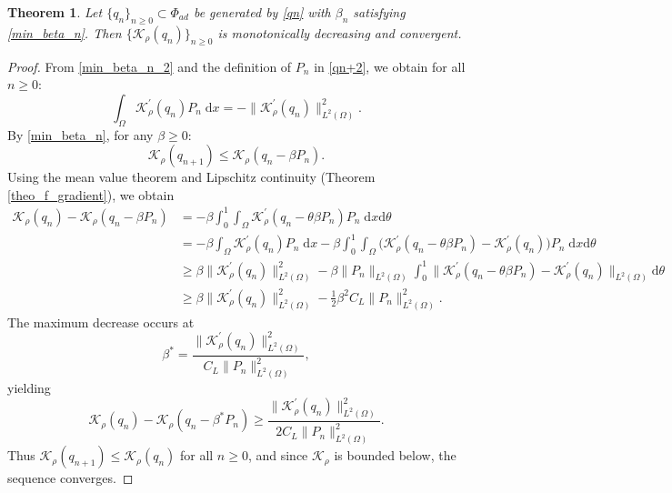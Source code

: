 \documentclass[a4paper,12pt,reqno,natbib]{amsart}
\newtheorem{theorem}{Theorem}
\newcommand{\dx} {\displaystyle\mathrm{d}x}
\begin{document}
{\begin{theorem} \label{theo_f_gradient_2}
    Let $\{q_n\}_{n\geq 0} \subset \Phi_{ad}$ be generated by \eqref{qn} with $\beta_n$ satisfying \eqref{min_beta_n}. Then $\{\mathcal{K}_\rho(q_n)\}_{n\geq 0}$ is monotonically decreasing and convergent.
\end{theorem}
\begin{proof}
From \eqref{min_beta_n_2} and the definition of $P_n$ in \eqref{qn+2}, we obtain for all $n \geq 0$:
\begin{equation*}
    \int_\Omega\mathcal{K}^\prime_\rho(q_n)P_n\;\dx=-\|\mathcal{K}^\prime_\rho(q_n) \|^2_{L^2(\Omega)}.
\end{equation*}
By \eqref{min_beta_n}, for any $\beta \geq 0$:
\begin{equation*}
    \mathcal{K}_\rho(q_{n+1}) \leq \mathcal{K}_\rho(q_n - \beta P_n).
\end{equation*}
Using the mean value theorem and Lipschitz continuity (Theorem \ref{theo_f_gradient}), we obtain
\begin{align*}
    \mathcal{K}_\rho(q_{n}) - \mathcal{K}_\rho(q_n - \beta P_n) &= -\beta \int_0^1\int_\Omega \mathcal{K}_\rho^\prime (q_n - \theta\beta P_n)P_n\;\dx\mathrm{d}\theta\\
    &= -\beta \int_\Omega \mathcal{K}_\rho^\prime (q_n )P_n\;\dx -\beta \int_0^1\int_\Omega \Big(\mathcal{K}_\rho^\prime (q_n - \theta\beta P_n) -\mathcal{K}_\rho^\prime (q_n )\Big)P_n\;\dx\mathrm{d}\theta\\
    &\geq  \beta \|\mathcal{K}^\prime_\rho(q_n) \|^2_{L^2(\Omega)} -\beta \|P_n\|_{L^2(\Omega)}\int_0^1 \|\mathcal{K}_\rho^\prime (q_n - \theta\beta P_n) -\mathcal{K}_\rho^\prime (q_n )\|_{L^2(\Omega)} \mathrm{d}\theta \\
    &\geq \beta \|\mathcal{K}^\prime_\rho(q_n) \|^2_{L^2(\Omega)} -\frac{1}{2}\beta^2 C_L \|P_n\|^2_{L^2(\Omega)}.
\end{align*}
The maximum decrease occurs at
\begin{equation*}
    \beta^*= \frac{\|\mathcal{K}^\prime_\rho(q_n) \|^2_{L^2(\Omega)}}{C_L\|P_n\|^2_{L^2(\Omega)}},
\end{equation*}
yielding
\begin{equation*}
    \mathcal{K}_\rho(q_{n}) - \mathcal{K}_\rho(q_n - \beta^* P_n)  \geq \frac{\|\mathcal{K}^\prime_\rho(q_n) \|^2_{L^2(\Omega)}}{2C_L\|P_n\|^2_{L^2(\Omega)}}.
\end{equation*}
Thus $\mathcal{K}_\rho(q_{n+1}) \leq \mathcal{K}_\rho(q_n)$ for all $n \geq 0$, and since $\mathcal{K}_\rho$ is bounded below, the sequence converges.
\end{proof}

}
\end{document}
